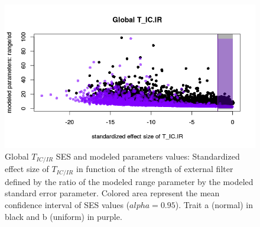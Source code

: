 \documentclass[12pt]{article}\usepackage[]{graphicx}\usepackage[]{color}
\makeatletter
\def\maxwidth{ %
  \ifdim\Gin@nat@width>\linewidth
    \linewidth
  \else
    \Gin@nat@width
  \fi
}
\newenvironment{knitrout}{}{} %
\makeatother
\begin{document}
\begin{knitrout}
\begin{figure}
{\centering \includegraphics[width=\maxwidth]{figure/External_filter_Results_plots_modeled_param1-1} 

}

\caption[Global $T_{IC/IR}$ SES and modeled parameters values]{Global $T_{IC/IR}$ SES and modeled parameters values: Standardized effect size of $T_{IC/IR}$ in function of the strength of external filter defined by the ratio of the modeled range parameter by the modeled standard error parameter. Colored area represent the mean confidence interval of SES values ($alpha = 0.95$). Trait a (normal) in black and b (uniform) in purple.}\label{fig:External_filter_Results_plots_modeled_param1}
\end{figure}


\end{knitrout}
\end{document}
